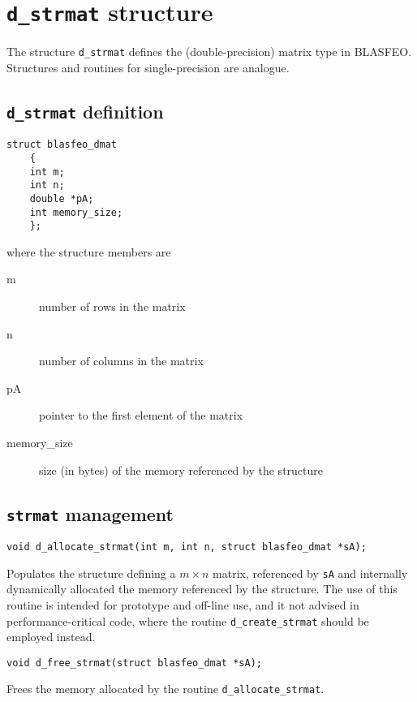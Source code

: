 \documentclass[a4paper]{report}
\begin{document}
\section{{\tt d\_strmat} structure}

The structure {\tt d\_strmat} defines the (double-precision) matrix type in BLASFEO.
Structures and routines for single-precision are analogue.



\subsection{{\tt d\_strmat} definition}

\begin{verbatim}
struct blasfeo_dmat 
    {
    int m;
    int n;
    double *pA;
    int memory_size;
    };
\end{verbatim}
where the structure members are
\begin{description}
\item[m] number of rows in the matrix
\item[n] number of columns in the matrix
\item[pA] pointer to the first element of the matrix
\item[memory\_size] size (in bytes) of the memory referenced by the structure
\end{description}



\subsection{{\tt strmat} management}

\begin{verbatim}
void d_allocate_strmat(int m, int n, struct blasfeo_dmat *sA);
\end{verbatim}
Populates the structure defining a $m\times n$ matrix, referenced by {\tt sA} and internally dynamically allocated the memory referenced by the structure.
The use of this routine is intended for prototype and off-line use, and it not advised in performance-critical code, where the routine {\tt d\_create\_strmat} should be employed instead.

\begin{verbatim}
void d_free_strmat(struct blasfeo_dmat *sA);
\end{verbatim}
Frees the memory allocated by the routine {\tt d\_allocate\_strmat}.
\end{document}
